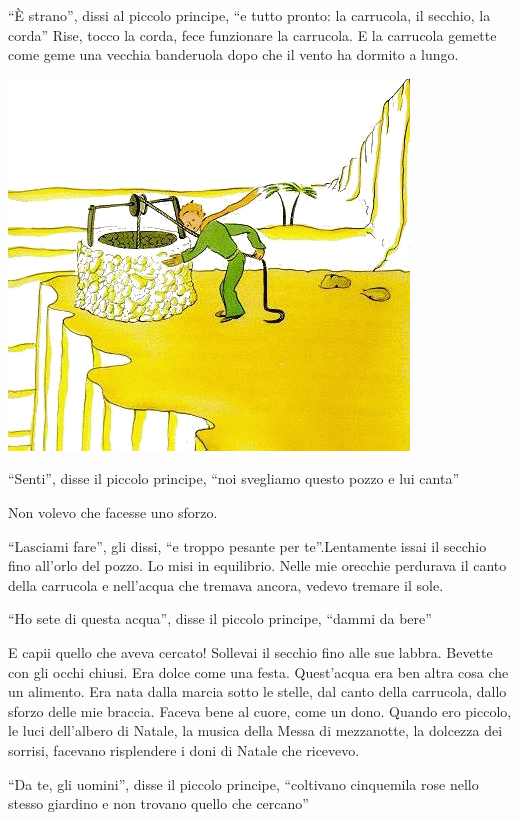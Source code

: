 \documentclass[11pt]{scrbook}
\begin{document}
``È strano'', dissi al piccolo principe, ``e tutto pronto: la carrucola,
il secchio, la corda'' Rise, tocco la corda, fece funzionare la
carrucola. E la carrucola gemette come geme una vecchia banderuola dopo
che il vento ha dormito a lungo.

\begin{center}
\includegraphics{./img/25a.png}
\end{center}

``Senti'', disse il piccolo principe, ``noi svegliamo questo pozzo e lui
canta''

Non volevo che facesse uno sforzo.

``Lasciami fare'', gli dissi, ``e troppo pesante per te''.Lentamente
issai il secchio fino all'orlo del pozzo. Lo misi in equilibrio. Nelle
mie orecchie perdurava il canto della carrucola e nell'acqua che tremava
ancora, vedevo tremare il sole.

``Ho sete di questa acqua'', disse il piccolo principe, ``dammi da
bere''

E capii quello che aveva cercato! Sollevai il secchio fino alle sue
labbra. Bevette con gli occhi chiusi. Era dolce come una festa.
Quest'acqua era ben altra cosa che un alimento. Era nata dalla marcia
sotto le stelle, dal canto della carrucola, dallo sforzo delle mie
braccia. Faceva bene al cuore, come un dono. Quando ero piccolo, le luci
dell'albero di Natale, la musica della Messa di mezzanotte, la dolcezza
dei sorrisi, facevano risplendere i doni di Natale che ricevevo.

``Da te, gli uomini'', disse il piccolo principe, ``coltivano cinquemila
rose nello stesso giardino e non trovano quello che cercano''
\end{document}
